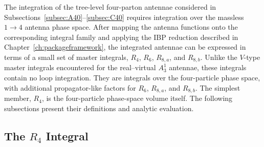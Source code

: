 The integration of the tree-level four-parton antennae considered in
Subsections~\ref{subsec:A40}--\ref{subsec:C40} requires integration over the massless $1\to4$
antenna phase space. After mapping the antenna functions onto the corresponding integral family
and applying the IBP reduction described in Chapter~\ref{ch:packageframework}, the integrated
antennae can be expressed in terms of a small set of master integrals, $R_4$, $R_6$,
$R_{8,a}$, and $R_{8,b}$. Unlike the $V$-type master integrals encountered for the
real--virtual $A_3^1$ antennae, these integrals contain no loop integration. They are integrals
over the four-particle phase space, with additional propagator-like factors for $R_6$,
$R_{8,a}$, and $R_{8,b}$. The simplest member, $R_4$, is the four-particle phase-space volume
itself. The following subsections present their definitions and analytic evaluation.

\subsection{The $R_4$ Integral}

